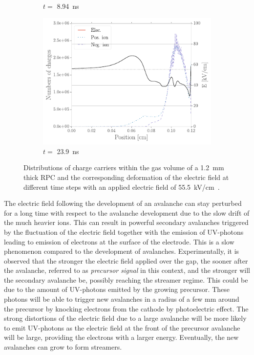 \begin{figure}[H]
\begin{subfigure}{0.5\linewidth}
			\caption{\label{fig:Avalanche-develop:C}$t=$ \SI{8.94}{ns}}
		\end{subfigure}
		\begin{subfigure}{0.5\linewidth}
			\centering
			\includegraphics[width = 0.55\plotwidth]{fig/chapt4/Avalanche_dev_step4.pdf}
			\caption{\label{fig:Avalanche-develop:D}$t=$ \SI{23.9}{ns}}
		\end{subfigure}
		\caption{\label{fig:Avalanche-develop} Distributions of charge carriers within the gas volume of a \SI{1.2}{mm} thick RPC and the corresponding deformation of the electric field at different time steps with an applied electric field of \SI{55.5}{kV/cm}~\cite{VINCENT2017}.}
	\end{figure}
	
	The electric field following the development of an avalanche can stay perturbed for a long time with respect to the avalanche development due to the slow drift of the much heavier ions. This can result in powerful secondary avalanches triggered by the fluctuation of the electric field together with the emission of UV-photons leading to emission of electrons at the surface of the electrode. This is a slow phenomenon compared to the development of avalanches. Experimentally, it is observed that the stronger the electric field applied over the gap, the sooner after the avalanche, referred to as \textit{precursor signal} in this context, and the stronger will the secondary avalanche be, possibly reaching the streamer regime. This could be due to the amount of UV-photons emitted by the growing precursor. These photons will be able to trigger new avalanches in a radius of a few \si{mm} around the precursor by knocking electrons from the cathode by photoelectric effect. The strong distortions of the electric field due to a large avalanche will be more likely to emit UV-photons as the electric field at the front of the precursor avalanche will be large, providing the electrons with a larger energy. Eventually, the new avalanches can grow to form streamers.
	

